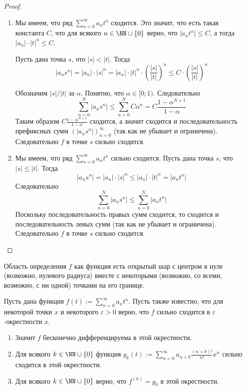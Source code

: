 \documentclass[12pt,a4paper]{article}
\begin{document}
    \begin{proof}\ 
        \begin{enumerate}
            \item Мы имеем, что ряд $\sum_{n=0}^\infty a_n t^n$ сходится. Это значит, что есть такая константа $C$, что для всякого $n \in \NN \cup \{0\}$ верно, что $|a_n t^n| \leqslant C$, а тогда $|a_n| \cdot |t|^n \leqslant C$.

                Пусть дана точка $s$, что $|s| < |t|$. Тогда
                \[|a_n s^n| = |a_n| \cdot |s|^n = |a_n| \cdot |t|^n \cdot \left(\frac{|s|}{|t|}\right)^n \leqslant C \cdot \left(\frac{|s|}{|t|}\right)^n\]

                Обозначим $|s|/|t|$ за $\alpha$. Понятно, что $\alpha \in [0; 1)$. Следовательно
                \[\sum_{n=0}^N |a_n s^n| \leqslant \sum_{n=0}^N C \alpha^n = C \frac{1 - \alpha^{N+1}}{1 - \alpha}\]
                Таким образом $C \frac{1 - \alpha^{N+1}}{1 - \alpha}$ сходится, а значит сходится и последовательность префиксных сумм $(|a_n s^n|)_{n=0}^\infty$ (так как не убывает и ограничена). Следовательно $f$ в точке $s$ сильно сходится.
            
            \item Мы имеем, что ряд $\sum_{n=0}^\infty a_n t^n$ сильно сходится. Пусть дана точка $s$, что $|s| \leqslant |t|$. Тогда
            \[|a_n s^n| = |a_n| \cdot |s|^n \leqslant |a_n| \cdot |t|^n = |a_n t^n|\]
            Следовательно
            \[\sum_{n=0}^N |a_n s^n| \leqslant \sum_{n=0}^N |a_n t^n|\]
            Поскольку последовательность правых сумм сходится, то сходится и последовательность левых сумм (так как не убывает и ограничена). Следовательно $f$ в точке $s$ сильно сходится.
        \end{enumerate}
    \end{proof}

    \begin{corollary}
        Область определения $f$ как функция есть открытый шар с центром в нуле (возможно, нулевого радиуса) вместе с некоторыми (возможно, со всеми, возможно, с ни одной) точками на его границе.
    \end{corollary}

    \begin{theorem}
        Пусть дана функция $f(t) := \sum_{n=0}^\infty a_n t^n$. Пусть также известно, что для некоторой точки $x$ и некоторого $\varepsilon > 0$ верно, что $f$ сильно сходится в $\varepsilon$-окрестности $x$.
        \begin{enumerate}
            \item Значит $f$ бесконечно дифференцируема в этой окрестности.
            \item Для всякого $k \in \NN \cup \{0\}$ функция $g_k(t) := \sum_{n=0}^\infty a_{n+k}\frac{(n+k)!}{n!}x^n$ сильно сходится в этой окрестности.
            \item Для всякого $k \in \NN \cup \{0\}$ верно, что $f^{(k)} = g_k$ в этой окрестности.
        \end{enumerate}
    \end{theorem}
\end{document}
